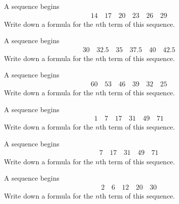 \clearpage\noindent%
\begin{tasks}
\task A sequence begins
      \begin{align*}
           14  \quad 17   \quad  20  \quad  23  \quad  26  \quad  29
      \end{align*}       
    Write down a formula for the $n$th term of this sequence.   \flushright {}



\task A sequence begins \\
      \begin{align*}
            30  \quad 32.5   \quad  35  \quad  37.5  \quad  40  \quad  42.5
      \end{align*}       
    Write down a formula for the $n$th term of this sequence.       

     \flushright {}
	 
\task A sequence begins \\
      \begin{align*}
            60  \quad 53  \quad  46  \quad  39  \quad  32  \quad  25
      \end{align*}       
    Write down a formula for the $n$th term of this sequence.       

    \flushright {}
    

\task A sequence begins \\
      \begin{align*}
            1  \quad 7  \quad  17  \quad  31  \quad  49  \quad  71 
      \end{align*}       
    Write down a formula for the $n$th term of this sequence.       

    \flushright {}

\task A sequence begins \\
      \begin{align*}
            7  \quad  17  \quad  31  \quad  49  \quad  71 
      \end{align*}       
    Write down a formula for the $n$th term of this sequence.%
    \flushright {}


\task A sequence begins \\
      \begin{align*}
            2  \quad  6  \quad  12  \quad  20  \quad  30 
      \end{align*}       
    Write down a formula for the $n$th term of this sequence.       


\end{tasks}

